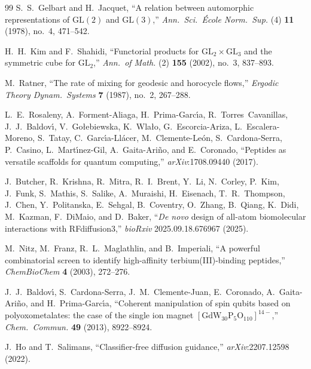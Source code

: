 \documentclass[11pt,oneside]{amsbook}
\numberwithin{equation}{section}
\theoremstyle{plain}
\theoremstyle{definition}
\theoremstyle{remark}
\begin{document}
\begin{thebibliography}{99}
S.~S.~Gelbart and H.~Jacquet,
\newblock ``A relation between automorphic representations of $\mathrm{GL}(2)$ and $\mathrm{GL}(3)$,''
\newblock \emph{Ann.\ Sci.\ \'Ecole Norm.\ Sup.} (4) \textbf{11} (1978), no.~4, 471--542.

H.~H.~Kim and F.~Shahidi,
\newblock ``Functorial products for $\mathrm{GL}_2\times\mathrm{GL}_3$ and the symmetric cube for $\mathrm{GL}_2$,''
\newblock \emph{Ann.\ of Math.} (2) \textbf{155} (2002), no.~3, 837--893.

M.~Ratner,
\newblock ``The rate of mixing for geodesic and horocycle flows,''
\newblock \emph{Ergodic Theory Dynam.\ Systems} \textbf{7} (1987), no.~2, 267--288.


L.~E.~Rosaleny, A.~Forment-Aliaga, H.~Prima-Garc\'{\i}a,
R.~Torres~Cavanillas, J.~J.~Baldov\'{\i}, V.~Go\l{}ebiewska,
K.~Wla\l{}o, G.~Escorcia-Ariza, L.~Escalera-Moreno, S.~Tatay,
C.~Garc\'{\i}a-Ll\'acer, M.~Clemente-Le\'on, S.~Cardona-Serra,
P.~Casino, L.~Mart\'{\i}nez-Gil, A.~Gaita-Ari\~no, and E.~Coronado,
\newblock ``Peptides as versatile scaffolds for quantum computing,''
\newblock \emph{arXiv}:1708.09440 (2017).

J.~Butcher, R.~Krishna, R.~Mitra, R.~I.~Brent, Y.~Li,
N.~Corley, P.~Kim, J.~Funk, S.~Mathis, S.~Salike,
A.~Muraishi, H.~Eisenach, T.~R.~Thompson, J.~Chen,
Y.~Politanska, E.~Sehgal, B.~Coventry, O.~Zhang, B.~Qiang,
K.~Didi, M.~Kazman, F.~DiMaio, and D.~Baker,
\newblock ``\emph{De novo} design of all-atom biomolecular interactions
with RFdiffusion3,''
\newblock \emph{bioRxiv} 2025.09.18.676967 (2025).

M.~Nitz, M.~Franz, R.~L.~Maglathlin, and B.~Imperiali,
\newblock ``A powerful combinatorial screen to identify high-affinity
terbium(III)-binding peptides,''
\newblock \emph{ChemBioChem} \textbf{4} (2003), 272--276.

J.~J.~Baldov\'{\i}, S.~Cardona-Serra, J.~M.~Clemente-Juan,
E.~Coronado, A.~Gaita-Ari\~no, and H.~Prima-Garc\'{\i}a,
\newblock ``Coherent manipulation of spin qubits based on
polyoxometalates: the case of the single ion magnet
$[\mathrm{GdW_{30}P_5O_{110}}]^{14-}$,''
\newblock \emph{Chem.\ Commun.} \textbf{49} (2013), 8922--8924.

J.~Ho and T.~Salimans,
\newblock ``Classifier-free diffusion guidance,''
\newblock \emph{arXiv}:2207.12598 (2022).


\end{thebibliography}
\end{document}
